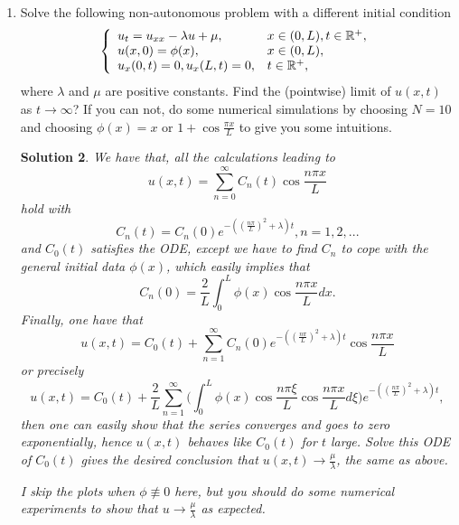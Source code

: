 \documentclass[6pt]{article}
\newtheorem{solution}{Solution}
\numberwithin{equation}{section}
\def\mathbb{\Bbb}
\begin{document}
\begin{enumerate}
\begin{solution}
Indeed, we can formally expect this solution without even solving the PDE.  This IBVP describes a homogeneous well--insulated bar with zero temperature, therefore, there is no heat flux at all afterwards, hence the PDE indeed should be an ODE.  Solving the ODE gives the desired solution.
\end{solution}

\item  Solve the following non-autonomous problem with a different initial condition
\begin{equation}\label{5a}
\left\{
\begin{array}{ll}
u_t=u_{xx}-\lambda u+\mu,& x\in(0,L),t\in\mathbb R^+,\\
u(x,0)=\phi(x),&x\in(0,L),\\
u_x(0,t)=0, u_x(L,t)=0, &t\in\mathbb R^+,
\end{array}
\right.
\end{equation}
where $\lambda$ and $\mu$ are positive constants.  Find the (pointwise) limit of $u(x,t)$ as $t\rightarrow\infty$?  If you can not, do some numerical simulations by choosing $N=10$ and choosing $\phi(x)=x$ or $1+\cos \frac{\pi x}{L}$ to give you some intuitions.
\begin{solution}
We have that, all the calculations leading to
\[u(x,t)=\sum_{n=0}^\infty C_n(t)\cos \frac{n\pi x}{L}\]
hold with
\[C_n(t)=C_n(0)e^{-((\frac{n\pi}{L})^2+\lambda)t}, n=1,2,...\]
and $C_0(t)$ satisfies the ODE, except we have to find $C_n$ to cope with the general initial data $\phi(x)$, which easily implies that
\[C_n(0)=\frac{2}{L}\int_0^ L \phi(x)\cos \frac{n\pi x}{L}dx. \]
Finally, one have that
\[u(x,t)=C_0(t)+\sum_{n=1}^\infty C_n(0)e^{-((\frac{n\pi}{L})^2+\lambda)t}\cos \frac{n\pi x}{L}\]
or precisely
\[u(x,t)=C_0(t)+\frac{2}{L} \sum_{n=1}^\infty \Big(\int_0^ L \phi(x)\cos \frac{n\pi \xi}{L} \cos \frac{n\pi x}{L} d\xi \Big)e^{-((\frac{n\pi}{L})^2+\lambda)t},\]
then one can easily show that the series converges and goes to zero exponentially, hence $u(x,t)$ behaves like $C_0(t)$ for $t$ large.  Solve this ODE of $C_0(t)$ gives the desired conclusion that $u(x,t)\rightarrow \frac{\mu}{\lambda}$, the same as above.

I skip the plots when $\phi\not\equiv 0$ here, but you should do some numerical experiments to show that $u\rightarrow \frac{\mu}{\lambda}$ as expected.
\end{solution}


\end{enumerate}
\end{document}
